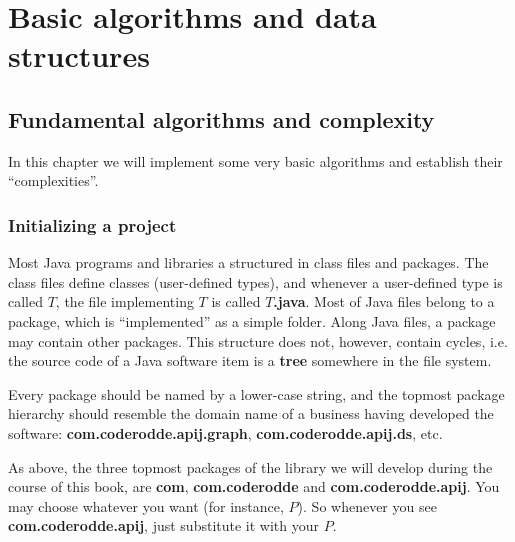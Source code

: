 \documentclass[oneside]{book}
\begin{document}
\part{Basic algorithms and data structures}  

\chapter{Fundamental algorithms and complexity}
In this chapter we will implement some very basic algorithms and establish their ``complexities''.

\section{Initializing a project}
Most Java programs and libraries a structured in class files and packages. The class files define classes (user-defined types), and whenever a user-defined type is called $T$, the file implementing $T$ is called $T$\textbf{.java}. Most of Java files belong to a package, which is ``implemented'' as a simple folder. Along Java files, a package may contain other packages. This structure does not, however, contain cycles, i.e. the source code of a Java software item is a \textbf{tree} somewhere in the file system. 

Every package should be named by a lower-case string, and the topmost package hierarchy should resemble the domain name of a business having developed the software: \textbf{com.coderodde.apij.graph}, \textbf{com.coderodde.apij.ds}, etc. 

As above, the three topmost packages of the library we will develop during the course of this book, are \textbf{com}, \textbf{com.coderodde} and \textbf{com.coderodde.apij}. You may choose whatever you want (for instance, $P$). So whenever you see \textbf{com.coderodde.apij}, just substitute it with your $P$.
\end{document}
